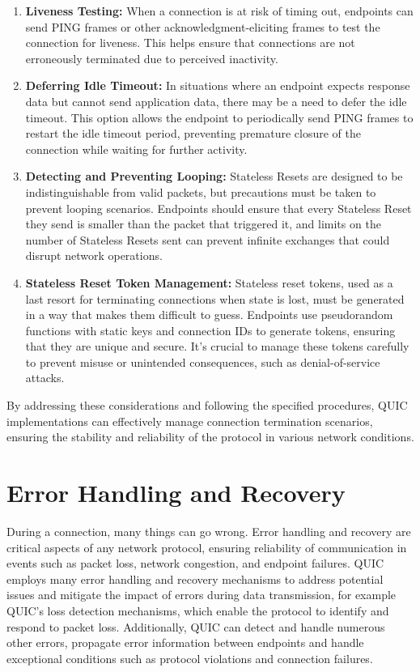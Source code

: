 \begingroup
\renewcommand\labelenumi{(\theenumi)}
\begin{enumerate}
\item \textbf{Liveness Testing:} When a connection is at risk of timing out, endpoints can send PING frames or other acknowledgment-eliciting frames to test the connection for liveness. This helps ensure that connections are not erroneously terminated due to perceived inactivity. \label{liveness_testing}
\item \textbf{Deferring Idle Timeout:} In situations where an endpoint expects response data but cannot send application data, there may be a need to defer the idle timeout. This option allows the endpoint to periodically send PING frames to restart the idle timeout period, preventing premature closure of the connection while waiting for further activity. \label{deferring_idle_timeout}
\item \textbf{Detecting and Preventing Looping:} Stateless Resets are designed to be indistinguishable from valid packets, but precautions must be taken to prevent looping scenarios. Endpoints should ensure that every Stateless Reset they send is smaller than the packet that triggered it, and limits on the number of Stateless Resets sent can prevent infinite exchanges that could disrupt network operations. \label{detecting_and_preventing_looping}
\item \textbf{Stateless Reset Token Management:} Stateless reset tokens, used as a last resort for terminating connections when state is lost, must be generated in a way that makes them difficult to guess. Endpoints use pseudorandom functions with static keys and connection IDs to generate tokens, ensuring that they are unique and secure. It's crucial to manage these tokens carefully to prevent misuse or unintended consequences, such as denial-of-service attacks. \label{stateless_reset_token_management}
\end{enumerate}
\endgroup

By addressing these considerations and following the specified procedures, QUIC implementations can effectively manage connection termination scenarios, ensuring the stability and reliability of the protocol in various network conditions.

\section{Error Handling and Recovery} \label{error_handling_recovery}

During a connection, many things can go wrong. Error handling and recovery are critical aspects of any network protocol, ensuring reliability of communication in events such as packet loss, network congestion, and endpoint failures. QUIC employs many error handling and recovery mechanisms to address potential issues and mitigate the impact of errors during data transmission, for example QUIC's loss detection mechanisms, which enable the protocol to identify and respond to packet loss. Additionally, QUIC can detect and handle numerous other errors, propagate error information between endpoints and handle exceptional conditions such as protocol violations and connection failures. 

